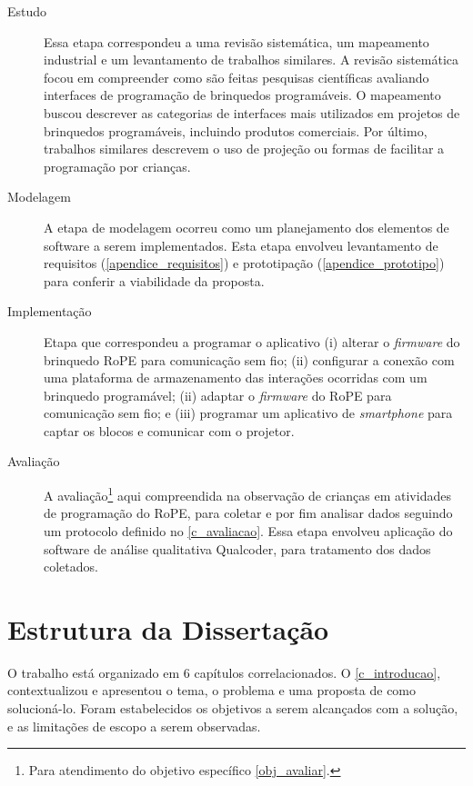 \begin{description}
    \item[Estudo] Essa etapa correspondeu a uma revisão sistemática, um mapeamento industrial e um levantamento de trabalhos similares. A revisão sistemática focou em compreender como são feitas pesquisas científicas avaliando interfaces de programação de brinquedos programáveis. O mapeamento buscou descrever as categorias de interfaces mais utilizados em projetos de brinquedos programáveis, incluindo produtos comerciais. Por último, trabalhos similares descrevem o uso de projeção ou formas de facilitar a programação por crianças.

    \item[Modelagem] A etapa de modelagem ocorreu como um planejamento dos elementos de software a serem implementados. Esta etapa envolveu levantamento de requisitos (\autoref{apendice_requisitos}) e prototipação (\autoref{apendice_prototipo}) para conferir a viabilidade da proposta. 

    \item[Implementação] Etapa que correspondeu a programar o aplicativo (i) alterar o \textit{firmware} do brinquedo RoPE para comunicação sem fio; (ii) configurar a conexão com uma plataforma de armazenamento das interações ocorridas com um brinquedo programável; (ii) adaptar o \textit{firmware} do RoPE para comunicação sem fio; e (iii) programar um aplicativo de \textit{smartphone} para captar os blocos e comunicar com o projetor.
   
    \item[Avaliação] A avaliação\footnote{Para atendimento do objetivo específico \autoref{obj_avaliar}.} aqui compreendida na observação de crianças em atividades de programação do RoPE, para coletar e por fim analisar dados seguindo um protocolo definido no \autoref{c_avaliacao}. Essa etapa envolveu aplicação do software de  análise qualitativa Qualcoder, para tratamento dos dados coletados. 

\end{description} 

\section{Estrutura da Dissertação}
\label{s_cintro_estrutura}

O trabalho está organizado em 6 capítulos correlacionados. O \autoref{c_introducao}, contextualizou e apresentou o tema, o problema e uma proposta de como solucioná-lo. Foram estabelecidos os objetivos a serem alcançados com a solução, e as limitações de escopo a serem observadas.

